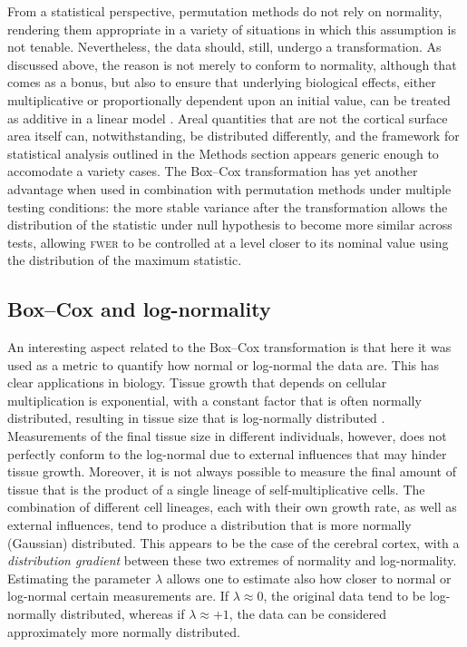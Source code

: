 From a statistical perspective, permutation methods do not rely on normality, rendering them appropriate in a variety of situations in which this assumption is not tenable. Nevertheless, the data should, still, undergo a transformation. As discussed above, the reason is not merely to conform to normality, although that comes as a bonus, but also to ensure that underlying biological effects, either multiplicative or proportionally dependent upon an initial value, can be treated as additive in a linear model \citep{Christensen2002}. Areal quantities that are not the cortical surface area itself can, notwithstanding, be distributed differently, and the framework for statistical analysis outlined in the Methods section appears generic enough to accomodate a variety cases. The Box--Cox transformation has yet another advantage when used in combination with permutation methods under multiple testing conditions: the more stable variance after the transformation allows the distribution of the statistic under null hypothesis to become more similar across tests, allowing \textsc{fwer} to be controlled at a level closer to its nominal value using the distribution of the maximum statistic.

\subsection{Box--Cox and log-normality}

An interesting aspect related to the Box--Cox transformation is that here it was used as a metric to quantify how normal or log-normal the data are. This has clear applications in biology. Tissue growth that depends on cellular multiplication is exponential, with a constant factor that is often normally distributed, resulting in tissue size that is log-normally distributed \citep[for a discussion, see][]{McAlister1879, Koch1966, Koch1969}. Measurements of the final tissue size in different individuals, however, does not perfectly conform to the log-normal due to external influences that may hinder tissue growth. Moreover, it is not always possible to measure the final amount of tissue that is the product of a single lineage of self-multiplicative cells. The combination of different cell lineages, each with their own growth rate, as well as external influences, tend to produce a distribution that is more normally (Gaussian) distributed. This appears to be the case of the cerebral cortex, with a \emph{distribution gradient} between these two extremes of normality and log-normality. Estimating the parameter $\lambda$ allows one to estimate also how closer to normal or log-normal certain measurements are. If $\lambda \approx 0$, the original data tend to be log-normally distributed, whereas if $\lambda \approx +1$, the data can be considered approximately more normally distributed.

